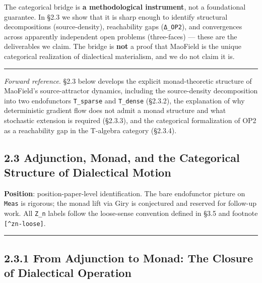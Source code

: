 \documentclass[
]{article}
\begin{document}
The categorical bridge is \textbf{a methodological instrument}, not a
foundational guarantee. In §2.3 we show that it is sharp enough to
identify structural decompositions (source-density), reachability gaps
(\texttt{Δ\_OP2}), and convergences across apparently independent open
problems (three-faces) --- these are the deliverables we claim. The
bridge is \textbf{not} a proof that MaoField is the unique categorical
realization of dialectical materialism, and we do not claim it is.

\begin{center}\rule{0.5\linewidth}{0.5pt}\end{center}

\emph{Forward reference}. §2.3 below develops the explicit
monad-theoretic structure of MaoField's source-attractor dynamics,
including the source-density decomposition into two endofunctors
\texttt{T\_sparse} and \texttt{T\_dense} (§2.3.2), the explanation of
why deterministic gradient flow does not admit a monad structure and
what stochastic extension is required (§2.3.3), and the categorical
formalization of OP2 as a reachability gap in the T-algebra category
(§2.3.4).

\hypertarget{adjunction-monad-and-the-categorical-structure-of-dialectical-motion}{%
\subsection{2.3 Adjunction, Monad, and the Categorical Structure of
Dialectical
Motion}\label{adjunction-monad-and-the-categorical-structure-of-dialectical-motion}}

\textbf{Position}: position-paper-level identification. The bare
endofunctor picture on \texttt{Meas} is rigorous; the monad lift via
Giry is conjectured and reserved for follow-up work. All \texttt{Z\_n}
labels follow the loose-sense convention defined in §3.5 and footnote
\texttt{{[}\^{}zn-loose{]}}.

\begin{center}\rule{0.5\linewidth}{0.5pt}\end{center}

\hypertarget{from-adjunction-to-monad-the-closure-of-dialectical-operation}{%
\subsection{2.3.1 From Adjunction to Monad: The Closure of Dialectical
Operation}\label{from-adjunction-to-monad-the-closure-of-dialectical-operation}}
\end{document}
